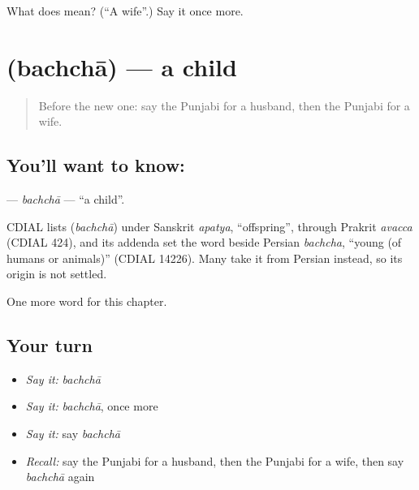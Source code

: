 \begin{tcolorbox}[breakable,colback=teal!4,colframe=teal!35!black,title={Before you move on}]
What does  mean? (\textquotedblleft{}A wife\textquotedblright{}.) Say it once more.
\end{tcolorbox}
\section[\texorpdfstring{\pa{ਬੱਚਾ} (bachchā)}{ਬੱਚਾ (bachchā)}]{ (bachchā) — a child}

\label{lesson:PA-C55-bachcha}



\begin{quote}
Before the new one: say the Punjabi for a husband, then the Punjabi for a wife.
\end{quote}

\subsection*{You'll want to know: }
\textbf{} — \emph{bachchā} — \textquotedblleft{}a child\textquotedblright{}.

\begin{cousinweb}
CDIAL lists \textbf{} (\emph{bachchā}) under Sanskrit \emph{apatya}, \textquotedblleft{}offspring\textquotedblright{}, through Prakrit \emph{avacca} (CDIAL 424), and its addenda set the word beside Persian \emph{bachcha}, \textquotedblleft{}young (of humans or animals)\textquotedblright{} (CDIAL 14226). Many take it from Persian instead, so its origin is not settled.
\end{cousinweb}

\begin{grammarlens}[title={What you've built}]
One more word for this chapter.
\end{grammarlens}

\subsection*{Your turn}
\begin{itemize}
\raggedright
  \item \emph{Say it:} \emph{bachchā}
  \item \emph{Say it:} \emph{bachchā}, once more
  \item \emph{Say it:} say \emph{bachchā}
  \item \emph{Recall:} say the Punjabi for a husband, then the Punjabi for a wife, then say \emph{bachchā} again
\end{itemize}

